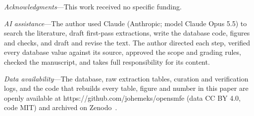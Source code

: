 \documentclass[10pt,twocolumn,letterpaper]{article}
\newcommand{\phead}[1]{\emph{#1}---}
\begin{document}
\vspace{1.5ex}
\noindent\phead{Acknowledgments}This work received no specific funding.

\vspace{1ex}
\noindent\phead{AI assistance}The author used Claude (Anthropic; model Claude Opus 5.5) to search the literature, draft first-pass extractions, write the database code, figures and checks, and draft and revise the text. The author directed each step, verified every database value against its source, approved the scope and grading rules, checked the manuscript, and takes full responsibility for its content.

\vspace{1ex}
\noindent\phead{Data availability}The database, raw extraction tables, curation and verification logs, and the code that rebuilds every table, figure and number in this paper are openly available at https://github.com/johemeks/opensmfe (data CC BY 4.0, code MIT) and archived on Zenodo~\cite{opensmfe}.
\end{document}
